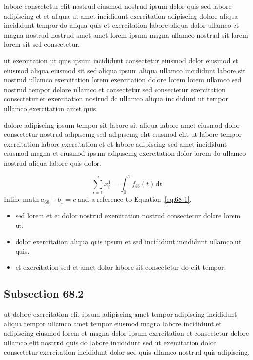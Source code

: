 \documentclass{article}
\begin{document}
labore consectetur elit nostrud eiusmod nostrud ipsum dolor quis sed labore adipiscing et et aliqua ut amet incididunt exercitation adipiscing dolore aliqua incididunt tempor do aliqua quis et exercitation labore aliqua dolor ullamco et magna nostrud nostrud amet amet lorem ipsum magna ullamco nostrud sit lorem lorem sit sed consectetur.

ut exercitation ut quis ipsum incididunt consectetur eiusmod dolor eiusmod et eiusmod aliqua eiusmod sit sed aliqua ipsum aliqua ullamco incididunt labore sit nostrud ullamco exercitation lorem exercitation dolore lorem lorem ullamco sed nostrud tempor dolore ullamco et consectetur sed consectetur exercitation consectetur et exercitation nostrud do ullamco aliqua incididunt ut tempor ullamco exercitation amet quis.

dolore adipiscing ipsum tempor sit labore sit aliqua labore amet eiusmod dolor consectetur nostrud adipiscing sed adipiscing elit eiusmod elit ut labore tempor exercitation labore exercitation et et labore adipiscing sed amet incididunt eiusmod magna et eiusmod ipsum adipiscing exercitation dolor lorem do ullamco nostrud aliqua labore quis dolor.

\begin{equation}\label{eq:68-1}
  \sum_{i=1}^{n} x_i^{1} = \int_0^1 f_{68}(t)\,\mathrm{d}t
\end{equation}
Inline math $a_{68} + b_{1} = c$ and a reference to Equation~\eqref{eq:68-1}.

\begin{itemize}
  \item sed lorem et et dolor nostrud exercitation nostrud consectetur dolore lorem ut.
  \item dolor exercitation aliqua quis ipsum et sed incididunt incididunt ullamco ut quis.
  \item et exercitation sed et amet dolor labore sit consectetur do elit tempor.
\end{itemize}

\subsection{Subsection 68.2}\label{sec:68-2}
ut dolore exercitation elit ipsum adipiscing amet tempor adipiscing incididunt aliqua tempor ullamco amet tempor eiusmod magna labore incididunt et adipiscing eiusmod lorem et magna dolor ipsum exercitation et consectetur dolore ullamco elit nostrud quis do labore incididunt sed ut exercitation dolor consectetur exercitation incididunt dolor sed quis ullamco nostrud quis adipiscing.
\end{document}
